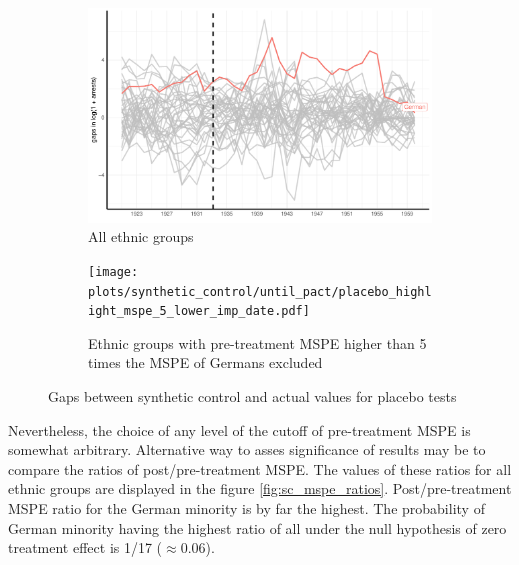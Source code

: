 \begin{figure}[hbtp] 
\begin{subfigure}{\textwidth}
\includegraphics[width=0.9\linewidth]{plots/synthetic_control/ethnicity_imputation/annual/placebo_highlight_all_imp_date.pdf}
\caption{All ethnic groups}
\label{fig:sc_placebo_gaps_all}
\end{subfigure}
\begin{subfigure}{\textwidth}
\texttt{[image: plots/synthetic\_control/until\_pact/placebo\_highlight\_mspe\_5\_lower\_imp\_date.pdf]}
\caption{Ethnic groups with pre-treatment MSPE higher than 5 times the MSPE of Germans excluded}
\label{fig:sc_placebo_gaps_all_5_times}
\end{subfigure}
\caption{Gaps between synthetic control and actual values for placebo tests}
\label{fig:sc_placebo_gaps}
\end{figure}

Nevertheless, the choice of any level of the cutoff of pre-treatment MSPE %
is somewhat arbitrary. Alternative way to asses significance of results may be to compare the ratios of  post/pre-treatment MSPE.  The values of these ratios for all ethnic groups are displayed in the figure \ref{fig:sc_mspe_ratios}. Post/pre-treatment MSPE ratio for the German minority is by far the highest. The probability of German minority having the highest ratio of all under the null hypothesis of zero treatment effect is 1/17 ($\approx 0.06$). 

